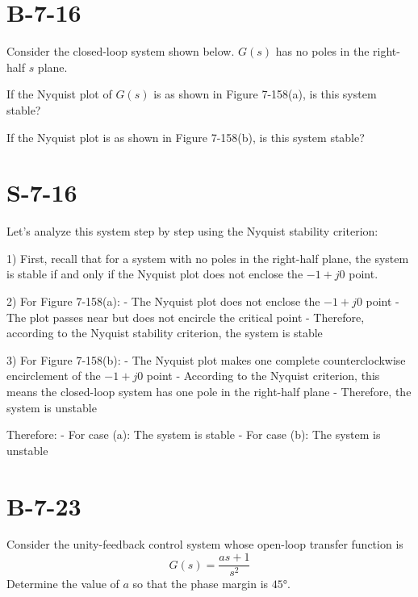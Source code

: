 \documentclass{article}
\begin{document}
\section*{B-7-16}
Consider the closed-loop system shown below. $G(s)$ has no poles in the right-half $s$ plane.

\begin{center}
\end{center}

If the Nyquist plot of $G(s)$ is as shown in Figure 7-158(a), is this system stable?

If the Nyquist plot is as shown in Figure 7-158(b), is this system stable?

\section*{S-7-16}
Let's analyze this system step by step using the Nyquist stability criterion:

1) First, recall that for a system with no poles in the right-half plane, the system is stable if and only if the Nyquist plot does not enclose the $-1+j0$ point.

2) For Figure 7-158(a):
   - The Nyquist plot does not enclose the $-1+j0$ point
   - The plot passes near but does not encircle the critical point
   - Therefore, according to the Nyquist stability criterion, the system is stable

3) For Figure 7-158(b):
   - The Nyquist plot makes one complete counterclockwise encirclement of the $-1+j0$ point
   - According to the Nyquist criterion, this means the closed-loop system has one pole in the right-half plane
   - Therefore, the system is unstable

Therefore:
- For case (a): The system is stable
- For case (b): The system is unstable
\section*{B-7-23}
Consider the unity-feedback control system whose open-loop transfer function is
\[
G(s) = \frac{as + 1}{s^2}
\]
Determine the value of $a$ so that the phase margin is $45°$.
\end{document}
